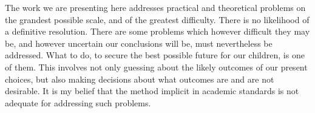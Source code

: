 The work we are presenting here addresses practical and theoretical problems on the grandest possible scale, and of the greatest difficulty.
There is no likelihood of a definitive resolution.
There are some problems which however difficult they may be, and however uncertain our conclusions will be, must nevertheless be addressed.
What to do, to secure the best possible future for our children, is one of them.
This involves not only guessing about the likely outcomes of our present choices, but also making decisions about what outcomes are and are not desirable.
It is my belief that the method implicit in academic standards is not adequate for addressing such problems.















